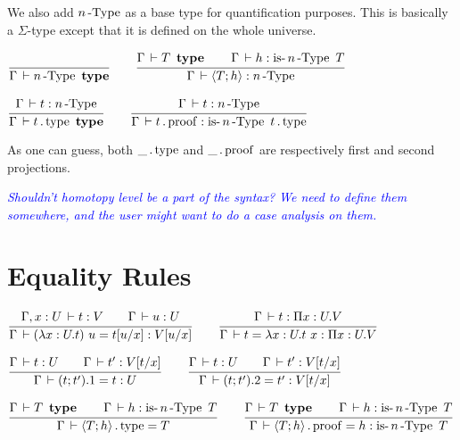 \documentclass[a4paper,english]{lipics-utf8x}
\newcommand\meta[1]{\noindent\textcolor{blue}{\emph{#1}}}
\begin{document}
  We also add $n\operatorname{-Type}$ as a base type for quantification
  purposes. This is basically a $\Sigma$-type except that it is
  defined on the whole universe.

  \begin{center}
  \(
    \ru{}{\Gamma \der \nType{n} \type}
    \qquad
    \ru{\Gamma \der T \type \qquad
        \Gamma \der h : \isnType{n}{T}
      }{\Gamma \der \hsig{T ; h} : \nType{n}}
  \)
  \end{center}

  \begin{center}
  \(
    \ru{\Gamma \der t : \nType{n}
      }{\Gamma \der t \gettype \type}
    \qquad
    \ru{\Gamma \der t : \nType{n}
      }{\Gamma \der t \getproof : \isnType{n}{t \gettype}}
  \)
  \end{center}

  As one can guess, both $\_ \operatorname{.type}$ and $\_ \operatorname{.proof}$ are respectively first
  and second projections.

  \meta{Shouldn't homotopy level be a part of the syntax? We need to define them
  somewhere, and the user might want to do a case analysis on them.}

  \section{Equality Rules}


  \begin{center}
  \(
    \ru{\Gamma, x:U \der t:V \qquad
        \Gamma \der u : U
      }{\Gamma \der (\lambda x:U.t)~u = t[u/x] : V[u/x]}
    \qquad
    \ru{\Gamma \der t : \Pi x:U.V
      }{\Gamma \der t = \lambda x:U.t~x : \Pi x:U.V}
  \)
  \end{center}

  \begin{center}
  \(
    \ru{\Gamma \der t : U \qquad
        \Gamma \der t' : V[t/x]
      }{\Gamma \der (t;t').1 = t : U}
    \qquad
    \ru{\Gamma \der t : U \qquad
        \Gamma \der t' : V[t/x]
      }{\Gamma \der (t;t').2 = t' : V[t/x]}
  \)
  \end{center}

  \begin{center}
  \(
    \ru{\Gamma \der T \type \qquad
        \Gamma \der h : \isnType{n}{T}
      }{\Gamma \der \hsig{T;h} \gettype = T}
    \qquad
    \ru{\Gamma \der T \type \qquad
        \Gamma \der h : \isnType{n}{T}
      }{\Gamma \der \hsig{T;h} \getproof = h : \isnType{n}{T}}
  \)
  \end{center}
\end{document}
